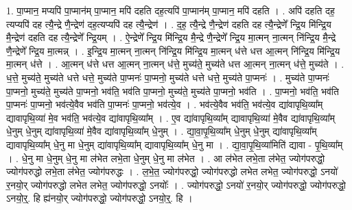 \documentclass[17pt]{extarticle}
\begin{document}
1. पा॒प्मान॒ मप्यपि॑ पा॒प्मान॑म् पा॒प्मान॒ मपि॑ दहति दह॒त्यपि॑ पा॒प्मान॑म् पा॒प्मान॒ मपि॑ दहति । . अपि॑ दहति दह॒ त्यप्यपि॑ दह त्यै॒न्द्रे णै॒न्द्रेण॑ दह॒त्यप्यपि॑ दह त्यै॒न्द्रेण॑ । . द॒ह॒ त्यै॒न्द्रे णै॒न्द्रेण॑ दहति दह त्यै॒न्द्रेणे᳚ न्द्रि॒य मि॑न्द्रि॒य मै॒न्द्रेण॑ दहति दह त्यै॒न्द्रेणे᳚ न्द्रि॒यम् । . ऐ॒न्द्रेणे᳚ न्द्रि॒य मि॑न्द्रि॒य मै॒न्द्रे णै॒न्द्रेणे᳚ न्द्रि॒य मा॒त्मन् ना॒त्मन् नि॑न्द्रि॒य मै॒न्द्रे णै॒न्द्रेणे᳚ न्द्रि॒य मा॒त्मन्न् । . इ॒न्द्रि॒य मा॒त्मन् ना॒त्मन् नि॑न्द्रि॒य मि॑न्द्रि॒य मा॒त्मन् ध॑त्ते धत्त आ॒त्मन् नि॑न्द्रि॒य मि॑न्द्रि॒य मा॒त्मन् ध॑त्ते । . आ॒त्मन् ध॑त्ते धत्त आ॒त्मन् ना॒त्मन् ध॑त्ते॒ मुच्य॑ते॒ मुच्य॑ते धत्त आ॒त्मन् ना॒त्मन् ध॑त्ते॒ मुच्य॑ते । . ध॒त्ते॒ मुच्य॑ते॒ मुच्य॑ते धत्ते धत्ते॒ मुच्य॑ते पा॒प्मनः॑ पा॒प्मनो॒ मुच्य॑ते धत्ते धत्ते॒ मुच्य॑ते पा॒प्मनः॑ । . मुच्य॑ते पा॒प्मनः॑ पा॒प्मनो॒ मुच्य॑ते॒ मुच्य॑ते पा॒प्मनो॒ भव॑ति॒ भव॑ति पा॒प्मनो॒ मुच्य॑ते॒ मुच्य॑ते पा॒प्मनो॒ भव॑ति । . पा॒प्मनो॒ भव॑ति॒ भव॑ति पा॒प्मनः॑ पा॒प्मनो॒ भव॑त्ये॒वैव भव॑ति पा॒प्मनः॑ पा॒प्मनो॒ भव॑त्ये॒व । . भव॑त्ये॒वैव भव॑ति॒ भव॑त्ये॒व द्या॑वापृथि॒व्या᳚म् द्यावापृथि॒व्या॑ मे॒व भव॑ति॒ भव॑त्ये॒व द्या॑वापृथि॒व्या᳚म् । . ए॒व द्या॑वापृथि॒व्या᳚म् द्यावापृथि॒व्या॑ मे॒वैव द्या॑वापृथि॒व्या᳚म् धे॒नुम् धे॒नुम् द्या॑वापृथि॒व्या॑ मे॒वैव द्या॑वापृथि॒व्या᳚म् धे॒नुम् । . द्या॒वा॒पृ॒थि॒व्या᳚म् धे॒नुम् धे॒नुम् द्या॑वापृथि॒व्या᳚म् द्यावापृथि॒व्या᳚म् धे॒नु मा धे॒नुम् द्या॑वापृथि॒व्या᳚म् द्यावापृथि॒व्या᳚म् धे॒नु मा । . द्या॒वा॒पृ॒थि॒व्या॑मिति॑ द्यावा - पृ॒थि॒व्या᳚म् । . धे॒नु मा धे॒नुम् धे॒नु मा ल॑भेत लभे॒ता धे॒नुम् धे॒नु मा ल॑भेत । . आ ल॑भेत लभे॒ता ल॑भेत॒ ज्योग॑परुद्धो॒ ज्योग॑परुद्धो लभे॒ता ल॑भेत॒ ज्योग॑परुद्धः । . ल॒भे॒त॒ ज्योग॑परुद्धो॒ ज्योग॑परुद्धो लभेत लभेत॒ ज्योग॑परुद्धो॒ ऽनयो॑ र॒नयो॒र् ज्योग॑परुद्धो लभेत लभेत॒ ज्योग॑परुद्धो॒ ऽनयोः᳚ । . ज्योग॑परुद्धो॒ ऽनयो॑ र॒नयो॒र् ज्योग॑परुद्धो॒ ज्योग॑परुद्धो॒ ऽनयो॒र्॒. हि ह्य॑नयो॒र् ज्योग॑परुद्धो॒ ज्योग॑परुद्धो॒ ऽनयो॒र्॒. हि । \newline
\end{document}
